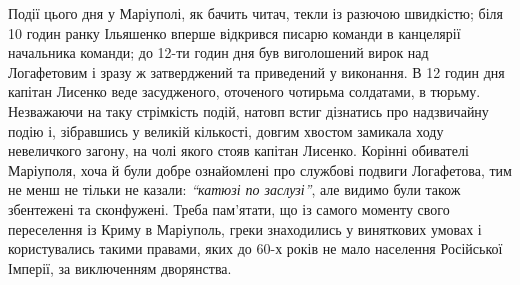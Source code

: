 \documentclass[a4paper,20pt]{report}
\begin{document}
Події цього дня у Маріуполі, як бачить читач, текли із разючою швидкістю;
біля 10 годин ранку Ільяшенко вперше відкрився писарю команди в канцелярії начальника команди;
до 12-ти годин дня був виголошений вирок над Логафетовим і зразу ж затверджений та
приведений у виконання. В 12 годин дня капітан Лисенко веде засудженого, оточеного чотирьма солдатами,
в тюрьму. Незважаючи на таку стрімкість подій, натовп встиг дізнатись про надзвичайну подію і,
зібравшись у великій кількості, довгим хвостом замикала ходу невеличкого загону, на чолі якого стояв 
капітан Лисенко. Корінні обивателі Маріуполя, хоча й були добре ознайомлені про службові подвиги
Логафетова, тим не менш не тільки не казали: \emph{``катюзі по заслузі''}, але видимо були також
збентежені та сконфужені. Треба пам'ятати, що із самого моменту свого переселення із Криму
в Маріуполь, греки знаходились у виняткових умовах і користувались такими правами, яких до 60-х років
не мало населення Російської Імперії, за виключенням дворянства.
\end{document}
